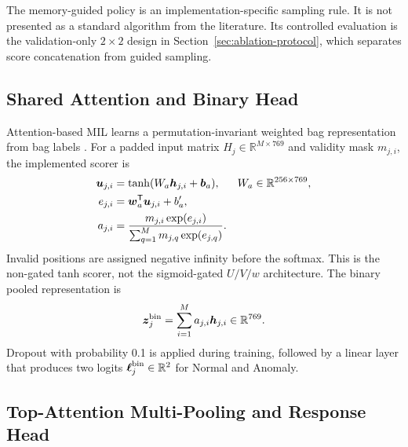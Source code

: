 The memory-guided policy is an implementation-specific sampling rule. It is not presented as a standard algorithm from the literature. Its controlled evaluation is the validation-only $2\times2$ design in Section~\ref{sec:ablation-protocol}, which separates score concatenation from guided sampling.

\subsection{Shared Attention and Binary Head}

Attention-based MIL learns a permutation-invariant weighted bag representation from bag labels \cite{ilse2018attention}. For a padded input matrix $H_j\in\mathbb{R}^{M\times769}$ and validity mask $m_{j,i}$, the implemented scorer is
\begin{align}
    \boldsymbol{u}_{j,i} &= \tanh(W_a\boldsymbol{h}_{j,i}+\boldsymbol{b}_a),
        &W_a&\in\mathbb{R}^{256\times769},\\
    e_{j,i} &= \boldsymbol{w}_a^{\mathsf{T}}\boldsymbol{u}_{j,i}+b_a',\\
    a_{j,i} &=
    \frac{m_{j,i}\exp(e_{j,i})}
    {\sum_{q=1}^{M}m_{j,q}\exp(e_{j,q})}.
    \label{eq:attention}
\end{align}
Invalid positions are assigned negative infinity before the softmax. This is the non-gated tanh scorer, not the sigmoid-gated $U/V/w$ architecture. The binary pooled representation is
\begin{equation}
    \boldsymbol{z}^{\mathrm{bin}}_j
    =\sum_{i=1}^{M}a_{j,i}\boldsymbol{h}_{j,i}
    \in\mathbb{R}^{769}.
\end{equation}
Dropout with probability 0.1 is applied during training, followed by a linear layer that produces two logits $\boldsymbol{\ell}^{\mathrm{bin}}_j\in\mathbb{R}^{2}$ for Normal and Anomaly.

\subsection{Top-Attention Multi-Pooling and Response Head}

